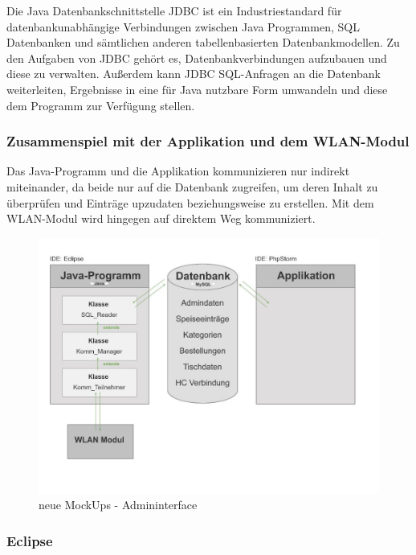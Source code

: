 Die Java Datenbankschnittstelle {JDBC\cite{jdbc}} ist ein Industriestandard für datenbankunabhängige Verbindungen zwischen Java Programmen, SQL Datenbanken und sämtlichen anderen tabellenbasierten Datenbankmodellen. Zu den Aufgaben von JDBC gehört es, Datenbankverbindungen aufzubauen und diese zu verwalten. Außerdem kann JDBC  SQL-Anfragen an die Datenbank weiterleiten, Ergebnisse in eine für Java nutzbare Form umwandeln und diese dem Programm zur Verfügung stellen.

	   \subsubsection{Zusammenspiel mit der Applikation und dem WLAN-Modul}
Das Java-Programm und die Applikation kommunizieren nur indirekt miteinander, da beide nur auf die Datenbank zugreifen, um deren Inhalt zu überprüfen und Einträge upzudaten beziehungsweise zu erstellen.
Mit dem WLAN-Modul wird hingegen auf direktem Weg kommuniziert.
			\begin{figure}[H]
			\begin{centering}
			\includegraphics[width = 1\textwidth]{Bilder/Jok_zusammenspiel_java.jpg}
			\par\end{centering}
			\caption{neue MockUps - Admininterface}
			\label{neue MockUps - Admininterface}
			\end{figure}

      \subsubsection{Eclipse}

